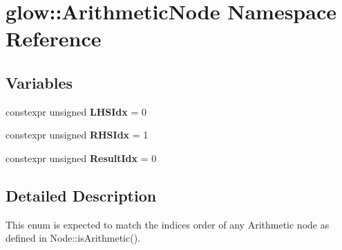 \hypertarget{namespaceglow_1_1_arithmetic_node}{}\section{glow\+:\+:Arithmetic\+Node Namespace Reference}
\label{namespaceglow_1_1_arithmetic_node}
\subsection*{Variables}
\begin{DoxyCompactItemize}
\item 
\mbox{\label{namespaceglow_1_1_arithmetic_node_acdb79a76b0d7b0895f36c3f793a81503}} 
constexpr unsigned {\bfseries L\+H\+S\+Idx} = 0
\item 
\mbox{\label{namespaceglow_1_1_arithmetic_node_a59727172b25b23bee8a9b558e3316064}} 
constexpr unsigned {\bfseries R\+H\+S\+Idx} = 1
\item 
\mbox{\label{namespaceglow_1_1_arithmetic_node_ae66d63f321e47d387b5811eecf8b4649}} 
constexpr unsigned {\bfseries Result\+Idx} = 0
\end{DoxyCompactItemize}


\subsection{Detailed Description}
This enum is expected to match the indices order of any Arithmetic node as defined in Node\+::is\+Arithmetic(). 